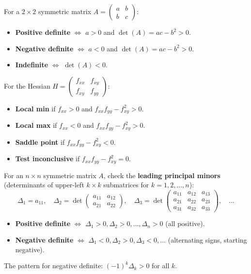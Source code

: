 \documentclass[11pt]{report}
\begin{document}
For a $2 \times 2$ symmetric matrix $A = \begin{pmatrix} a & b \\ b & c \end{pmatrix}$:

\begin{itemize}
    \item \textbf{Positive definite} $\iff$ $a > 0$ and $\det(A) = ac - b^2 > 0$.
    \item \textbf{Negative definite} $\iff$ $a < 0$ and $\det(A) = ac - b^2 > 0$.
    \item \textbf{Indefinite} $\iff$ $\det(A) < 0$.
\end{itemize}

For the Hessian $H = \begin{pmatrix} f_{xx} & f_{xy} \\ f_{xy} & f_{yy} \end{pmatrix}$:
\begin{itemize}
    \item \textbf{Local min} if $f_{xx} > 0$ and $f_{xx} f_{yy} - f_{xy}^2 > 0$.
    \item \textbf{Local max} if $f_{xx} < 0$ and $f_{xx} f_{yy} - f_{xy}^2 > 0$.
    \item \textbf{Saddle point} if $f_{xx} f_{yy} - f_{xy}^2 < 0$.
    \item \textbf{Test inconclusive} if $f_{xx} f_{yy} - f_{xy}^2 = 0$.
\end{itemize}

\begin{remark}
For an $n \times n$ symmetric matrix $A$, check the \textbf{leading principal minors} (determinants of upper-left $k \times k$ submatrices for $k = 1, 2, \ldots, n$):
\[
\Delta_1 = a_{11}, \quad \Delta_2 = \det \begin{pmatrix} a_{11} & a_{12} \\ a_{21} & a_{22} \end{pmatrix}, \quad \Delta_3 = \det \begin{pmatrix} a_{11} & a_{12} & a_{13} \\ a_{21} & a_{22} & a_{23} \\ a_{31} & a_{32} & a_{33} \end{pmatrix}, \quad \ldots
\]

\begin{itemize}
    \item \textbf{Positive definite} $\iff$ $\Delta_1 > 0, \Delta_2 > 0, \ldots, \Delta_n > 0$ (all positive).
    \item \textbf{Negative definite} $\iff$ $\Delta_1 < 0, \Delta_2 > 0, \Delta_3 < 0, \ldots$ (alternating signs, starting negative).
\end{itemize}

The pattern for negative definite: $(-1)^k \Delta_k > 0$ for all $k$.
\end{remark}
\end{document}
